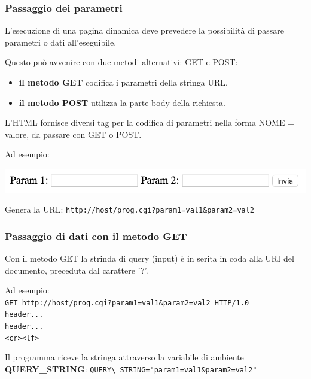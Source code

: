         \subsubsection{Passaggio dei parametri}
            L'esecuzione di una pagina dinamica deve prevedere la possibilità di passare parametri o dati all'eseguibile.
        
            Questo può avvenire con due metodi alternativi: GET e POST:
            \begin{itemize}
                \item \textbf{il metodo GET} codifica i parametri della stringa URL.
                \item \textbf{il metodo POST} utilizza la parte body della richiesta.
            \end{itemize}

            L'HTML fornisce diversi tag per la codifica di parametri nella forma NOME = valore, da passare con GET o POST.

            Ad esempio:

            

            \begin{center}
                \includegraphics[scale=0.65]{chapters/6/assets/schema_t.png}

                Genera la URL: \verb-http://host/prog.cgi?param1=val1&param2=val2-
            \end{center}

        \subsubsection{Passaggio di dati con il metodo GET}
            Con il metodo GET la strinda di query (input) è in serita in coda alla URI del documento, preceduta dal carattere '?'.
        
            Ad esempio:\\
            \verb-GET http://host/prog.cgi?param1=val1&param2=val2 HTTP/1.0-\\
            \verb:header...:\\
            \verb:header...:\\
            \verb:<cr><lf>:

            Il programma riceve la stringa attraverso la variabile di ambiente \textbf{QUERY\_STRING}: \verb:QUERY\_STRING="param1=val1&param2=val2":

